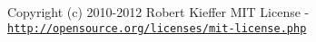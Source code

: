 Copyright (c) 2010-\/2012 Robert Kieffer M\+IT License -\/ \href{http://opensource.org/licenses/mit-license.php}{\tt http\+://opensource.\+org/licenses/mit-\/license.\+php} 